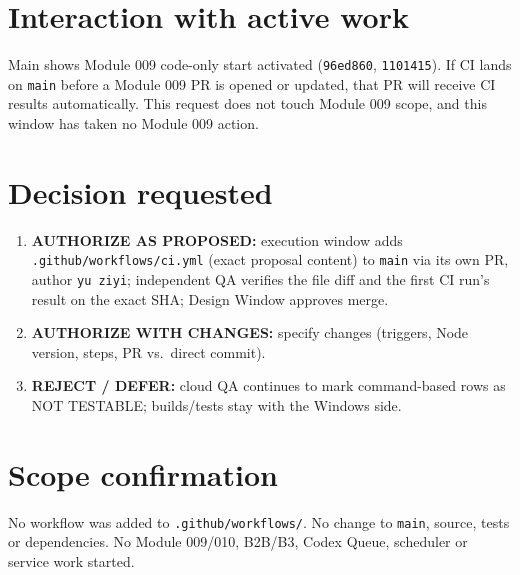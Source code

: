 \documentclass[11pt,a4paper]{article}
\newcommand{\sha}[1]{\texttt{\small #1}}
\begin{document}
\section{Interaction with active work}
Main shows Module 009 code-only start activated (\sha{96ed860}, \sha{1101415}). If CI lands on \texttt{main} before a Module 009 PR is opened or updated, that PR will receive CI results automatically. This request does not touch Module 009 scope, and this window has taken no Module 009 action.

\section{Decision requested}\label{sec:decision}
\begin{enumerate}
  \item \textbf{AUTHORIZE AS PROPOSED:} execution window adds \texttt{.github/workflows/ci.yml} (exact proposal content) to \texttt{main} via its own PR, author \texttt{yu ziyi}; independent QA verifies the file diff and the first CI run's result on the exact SHA; Design Window approves merge.
  \item \textbf{AUTHORIZE WITH CHANGES:} specify changes (triggers, Node version, steps, PR vs.\ direct commit).
  \item \textbf{REJECT / DEFER:} cloud QA continues to mark command-based rows as NOT TESTABLE; builds/tests stay with the Windows side.
\end{enumerate}

\section{Scope confirmation}
No workflow was added to \texttt{.github/workflows/}. No change to \texttt{main}, source, tests or dependencies. No Module 009/010, B2B/B3, Codex Queue, scheduler or service work started.
\end{document}

